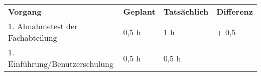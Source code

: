 \begin{tabular}{llll}
\rowcolor{heading}\textbf{Vorgang} & \textbf{Geplant} & \textbf{Tatsächlich} & \textbf{Differenz} \\
1. Abnahmetest der Fachabteilung & 0,5 h   & 1 h   & + 0,5  \\
1. Einführung/Benutzerschulung & 0,5 h   & 0,5 h   &  \\
\end{tabular}
